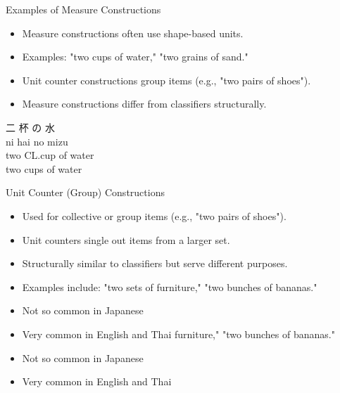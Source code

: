 \documentclass{beamer}
\begin{document}
\begin{frame}{Examples of Measure Constructions}
\begin{itemize}
    \item Measure constructions often use shape-based units.
    \item Examples: "two cups of water," "two grains of sand."
    \item Unit counter constructions group items (e.g., "two pairs of shoes").
    \item Measure constructions differ from classifiers structurally.
\end{itemize}
\begin{exe}
\ex
\glll 二 杯 の 水 \\
    ni hai no mizu \\
    two CL.cup of water \\
\trans two cups of water \\
\end{exe}
\end{frame}

\begin{frame}{Unit Counter (Group) Constructions}
\begin{itemize}
    \item Used for collective or group items (e.g., "two pairs of shoes").
    \item Unit counters single out items from a larger set.
    \item Structurally similar to classifiers but serve different purposes.
    \item Examples include: "two sets of furniture," "two bunches of bananas."
    \item Not so common in Japanese
    \item Very common in English and Thai
      furniture," "two bunches of bananas."
    \item Not so common in Japanese
    \item Very common in English and Thai
      \begin{exe}      
      \ex {}
      \ex {}
      \ex {}
      \end{exe}
\end{itemize}
\end{frame}
\end{document}

